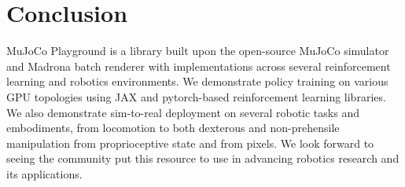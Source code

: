 \section{Conclusion}

MuJoCo Playground is a library built upon the open-source MuJoCo simulator and Madrona batch renderer with implementations across several reinforcement learning and robotics environments. We demonstrate policy training on various GPU topologies using JAX and pytorch-based reinforcement learning libraries. We also demonstrate sim-to-real deployment on several robotic tasks and embodiments, from locomotion to both dexterous and non-prehensile manipulation from proprioceptive state and from pixels. We look forward to seeing the community put this resource to use in advancing robotics research and its applications.
